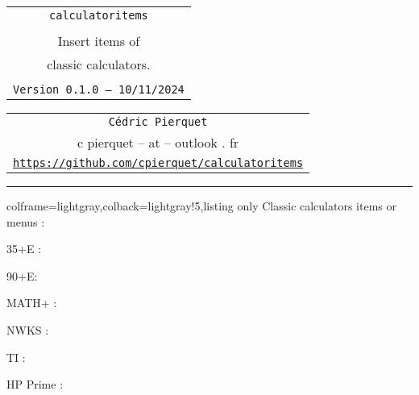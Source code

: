 \documentclass[11pt,a4paper]{ltxdoc}
\def\TPversion{0.1.0}
\def\TPdate{10/11/2024}
\begin{document}
\thispagestyle{empty}

\begin{center}
	\begin{minipage}{0.88\linewidth}
		\begin{tcolorbox}[colframe=yellow,colback=yellow!15]
			\begin{center}
				\renewcommand{\arraystretch}{1.25}%
				\begin{tabular}{c}
					{\Huge \texttt{calculatoritems}}\\
					\\
					{\LARGE Insert items of} \\
					{\LARGE classic calculators.} \\
					\\
					{\small \texttt{Version \TPversion{} -- \TPdate}}
				\end{tabular}
			\end{center}
		\end{tcolorbox}
	\end{minipage}
\end{center}

\begin{center}
	\begin{tabular}{c}
		\texttt{Cédric Pierquet}\\
		{\ttfamily c pierquet -- at -- outlook . fr}\\
		\texttt{\url{https://github.com/cpierquet/calculatoritems}} \\
	\end{tabular}
\end{center}

\hrule

\vfill

\begin{tcblisting}{colframe=lightgray,colback=lightgray!5,listing only}
Classic calculators items or menus :

35+E :

90+E:

MATH+ :

NWKS :

TI :

HP Prime :
\end{tcblisting}
\end{document}
